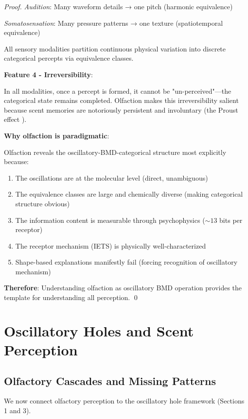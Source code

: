 \documentclass[11pt]{article}
\theoremstyle{remark}
\begin{document}
\begin{proof}
\textit{Audition}: Many waveform details → one pitch (harmonic equivalence)

\textit{Somatosensation}: Many pressure patterns → one texture (spatiotemporal equivalence)

All sensory modalities partition continuous physical variation into discrete categorical percepts via equivalence classes.

\textbf{Feature 4 - Irreversibility}:

In all modalities, once a percept is formed, it cannot be "un-perceived"—the categorical state remains completed. Olfaction makes this irreversibility salient because scent memories are notoriously persistent and involuntary (the Proust effect \cite{chu2003proust}).

\textbf{Why olfaction is paradigmatic}:

Olfaction reveals the oscillatory-BMD-categorical structure most explicitly because:
\begin{enumerate}
\item The oscillations are at the molecular level (direct, unambiguous)
\item The equivalence classes are large and chemically diverse (making categorical structure obvious)
\item The information content is measurable through psychophysics ($\sim 13$ bits per receptor)
\item The receptor mechanism (IETS) is physically well-characterized
\item Shape-based explanations manifestly fail (forcing recognition of oscillatory mechanism)
\end{enumerate}

\textbf{Therefore}: Understanding olfaction as oscillatory BMD operation provides the template for understanding all perception. \qed
\end{proof}

\section{Oscillatory Holes and Scent Perception}

\subsection{Olfactory Cascades and Missing Patterns}

We now connect olfactory perception to the oscillatory hole framework (Sections 1 and 3).
\end{document}
